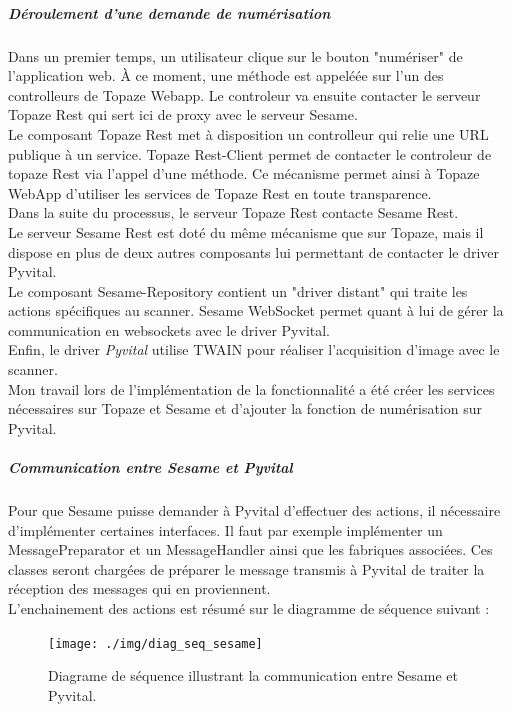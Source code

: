 \subparagraph*{Déroulement d'une demande de numérisation}
Dans un premier temps, un utilisateur clique sur le bouton "numériser" de l'application web. À ce moment, une méthode est appeléée sur l'un des controlleurs de Topaze Webapp. Le controleur va ensuite contacter le serveur Topaze Rest qui sert ici de proxy avec le serveur Sesame. \\
Le composant Topaze Rest met à disposition un controlleur qui relie une URL publique à un service. Topaze Rest-Client permet de contacter le controleur de topaze Rest via l'appel d'une méthode. Ce mécanisme permet ainsi à Topaze WebApp d'utiliser les services de Topaze Rest en toute transparence. \\
Dans la suite du processus, le serveur Topaze Rest contacte Sesame Rest. \\
Le serveur Sesame Rest est doté du même mécanisme que sur Topaze, mais il dispose en plus de deux autres composants lui permettant de contacter le driver Pyvital.\\
Le composant Sesame-Repository contient un "driver distant" qui traite les actions spécifiques au scanner. Sesame WebSocket permet quant à lui de gérer la communication en websockets avec le driver Pyvital.\\
Enfin, le driver \textit{Pyvital} utilise TWAIN pour réaliser l'acquisition d'image avec le scanner.\\

Mon travail lors de l'implémentation de la fonctionnalité a été créer les services nécessaires sur Topaze et Sesame et d'ajouter la fonction de numérisation sur Pyvital.

\subparagraph*{Communication entre Sesame et Pyvital}
Pour que Sesame puisse demander à Pyvital d'effectuer des actions, il nécessaire d'implémenter certaines interfaces. Il faut par exemple implémenter un MessagePreparator et un MessageHandler ainsi que les fabriques associées. Ces classes seront chargées de préparer le message transmis à Pyvital de traiter la réception des messages qui en proviennent. \\

L'enchainement des actions est résumé sur le diagramme de séquence suivant :

\begin{figure}[H]
  \centering
  \texttt{[image: ./img/diag\_seq\_sesame]}
  \caption{\label{fig:diag_seq_sesame} Diagrame de séquence illustrant la communication entre Sesame et Pyvital.}
\end{figure}

